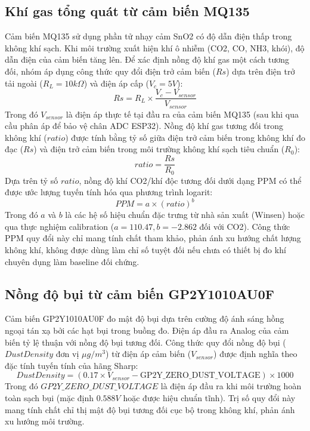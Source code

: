 \subsection{Khí gas tổng quát từ cảm biến MQ135}
Cảm biến MQ135 sử dụng phần tử nhạy cảm SnO2 có độ dẫn điện thấp trong không khí sạch. Khi môi trường xuất hiện khí ô nhiễm (CO2, CO, NH3, khói), độ dẫn điện của cảm biến tăng lên.
Để xác định nồng độ khí gas một cách tương đối, nhóm áp dụng công thức quy đổi điện trở cảm biến ($Rs$) dựa trên điện trở tải ngoài ($R_L = 10k\Omega$) và điện áp cấp ($V_c = 5V$):
\begin{equation}
    Rs = R_L \times \frac{V_c - V_{sensor}}{V_{sensor}}
\end{equation}
Trong đó $V_{sensor}$ là điện áp thực tế tại đầu ra của cảm biến MQ135 (sau khi qua cầu phân áp để bảo vệ chân ADC ESP32). Nồng độ khí gas tương đối trong không khí ($ratio$) được tính bằng tỷ số giữa điện trở cảm biến trong không khí đo đạc ($Rs$) và điện trở cảm biến trong môi trường không khí sạch tiêu chuẩn ($R_0$):
\begin{equation}
    ratio = \frac{Rs}{R_0}
\end{equation}
Dựa trên tỷ số $ratio$, nồng độ khí CO2/khí độc tương đối dưới dạng PPM có thể được ước lượng tuyến tính hóa qua phương trình logarit:
\begin{equation}
    PPM = a \times (ratio)^b
\end{equation}
Trong đó $a$ và $b$ là các hệ số hiệu chuẩn đặc trưng từ nhà sản xuất (Winsen) hoặc qua thực nghiệm calibration ($a = 110.47, b = -2.862$ đối với CO2). Công thức PPM quy đổi này chỉ mang tính chất tham khảo, phản ánh xu hướng chất lượng không khí, không được dùng làm chỉ số tuyệt đối nếu chưa có thiết bị đo khí chuyên dụng làm baseline đối chứng.

\subsection{Nồng độ bụi từ cảm biến GP2Y1010AU0F}
Cảm biến GP2Y1010AU0F đo mật độ bụi dựa trên cường độ ánh sáng hồng ngoại tán xạ bởi các hạt bụi trong buồng đo. Điện áp đầu ra Analog của cảm biến tỷ lệ thuận với nồng độ bụi tương đối.
Công thức quy đổi nồng độ bụi ($DustDensity$ đơn vị $\mu g/m^3$) từ điện áp cảm biến ($V_{sensor}$) được định nghĩa theo đặc tính tuyến tính của hãng Sharp:
\begin{equation}
    DustDensity = (0.17 \times V_{sensor} - \text{GP2Y\_ZERO\_DUST\_VOLTAGE}) \times 1000
\end{equation}
Trong đó $GP2Y\_ZERO\_DUST\_VOLTAGE$ là điện áp đầu ra khi môi trường hoàn toàn sạch bụi (mặc định $0.588V$ hoặc được hiệu chuẩn tĩnh). Trị số quy đổi này mang tính chất chỉ thị mật độ bụi tương đối cục bộ trong không khí, phản ánh xu hướng môi trường.

